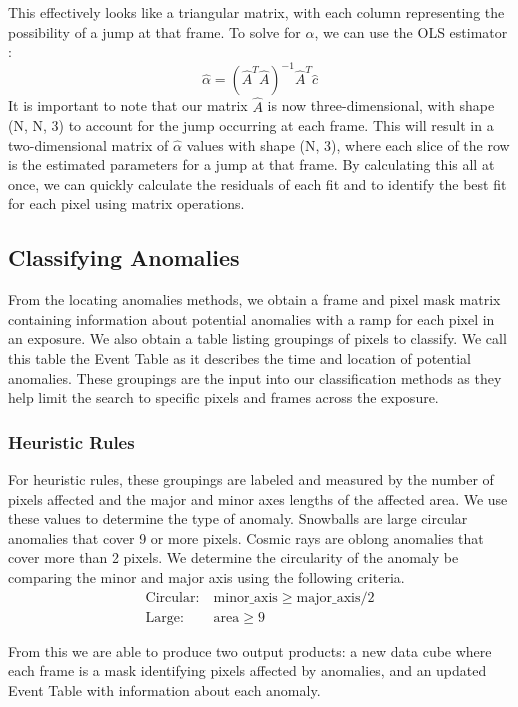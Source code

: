 This effectively looks like a triangular matrix, with each column representing the possibility of a jump at that frame.
To solve for $\alpha$, we can use the OLS estimator \parencite{puntanen1989equality}:
\begin{equation}
    \hat{\alpha} = (\hat{A}^T \hat{A})^{-1} \hat{A}^T \hat{c}
\end{equation}
It is important to note that our matrix $\hat{A}$ is now three-dimensional, with shape (N, N, 3) to account for the jump occurring at each frame.
This will result in a two-dimensional matrix of $\hat{\alpha}$ values with shape (N, 3), where each slice of the row is the estimated parameters for a jump at that frame.
By calculating this all at once, we can quickly calculate the residuals of each fit and to identify the best fit for each pixel using matrix operations.

\subsection{Classifying Anomalies}
From the locating anomalies methods, we obtain a frame and pixel mask matrix containing information about potential anomalies with a ramp for each pixel in an exposure. 
We also obtain a table listing groupings of pixels to classify. We call this table the Event Table as it describes the time and location of potential anomalies. 
These groupings are the input into our classification methods as they help limit the search to specific pixels and frames across the exposure. 

\subsubsection{Heuristic Rules}
For heuristic rules, these groupings are labeled and measured by the number of pixels affected and the major and minor axes lengths of the affected area. 
We use these values to determine the type of anomaly.
Snowballs are large circular anomalies that cover 9 or more pixels.
Cosmic rays are oblong anomalies that cover more than 2 pixels. 
We determine the circularity of the anomaly be comparing the minor and major axis using the following criteria.
\begin{align*}
    \text{Circular:}\ &  \text{minor\_axis} \geq \text{major\_axis}/2 \\
    \text{Large:}\ & \text{area} \geq 9
\end{align*}

From this we are able to produce two output products: a new data cube where each frame is a mask identifying pixels affected by anomalies, and an updated Event Table with information about each anomaly. 

